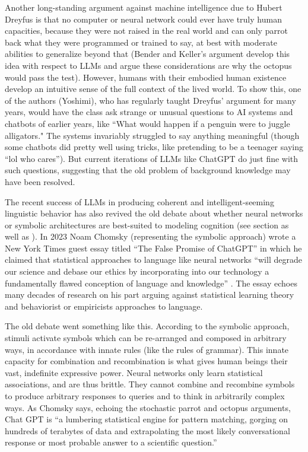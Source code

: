 Another long-standing argument against machine intelligence due to Hubert
Dreyfus \cite{dreyfus1992computers} is that no computer or neural network could
ever have truly human capacities, because they were not raised in the real
world and can only parrot back what they were programmed or trained to say, at
best with moderate abilities to generalize beyond that (Bender and Keller's
argument develop this idea with respect to LLMs and argue these considerations
are why the octopus would pass the test). However, humans with their embodied
human existence develop an intuitive sense of the full context of the lived
world. To show this, one of the authors (Yoshimi), who has regularly taught
Dreyfus'  argument for many years, would have the class ask strange or unusual
questions to AI systems and chatbots of earlier years, like ``What would happen
if a penguin were to juggle alligators." The systems invariably struggled to
say anything meaningful (though some chatbots did pretty well using tricks,
like pretending to be a teenager saying ``lol who cares''). But current
iterations of LLMs like ChatGPT do just fine with such questions, suggesting
that the old problem of background knowledge may have been resolved. 

The recent success of LLMs in producing coherent and intelligent-seeming
linguistic behavior has also revived the old debate about whether neural
networks or symbolic architectures are best-suited to modeling cognition (see
section  as well as \cite{king2024large}). In 2023 Noam Chomsky
(representing the symbolic approach) wrote a New York Times guest essay titled
``The False Promise of ChatGPT'' in which he claimed that statistical
approaches to language like neural networks ``will degrade our science and
debase our ethics by incorporating into our technology a fundamentally flawed
conception of language and knowledge'' \cite{chomsky2023noam}. The essay echoes
many decades of research on his part arguing against statistical learning
theory and behaviorist or empiricists approaches to language. 

The old debate went something like this. According to the symbolic approach,
stimuli activate symbols which can be re-arranged and composed in arbitrary
ways, in accordance with innate rules (like the rules of grammar). This innate
capacity for combination and recombination is what gives human beings their
vast, indefinite expressive power. Neural networks only learn statistical
associations, and are thus brittle. They cannot combine and recombine symbols
to produce arbitrary responses to queries and to think in arbitrarily complex
ways. As Chomsky says, echoing the stochastic parrot and octopus arguments,
Chat GPT is ``a lumbering statistical engine for pattern matching, gorging on
hundreds of terabytes of data and extrapolating the most likely conversational
response or most probable answer to a scientific question.''

